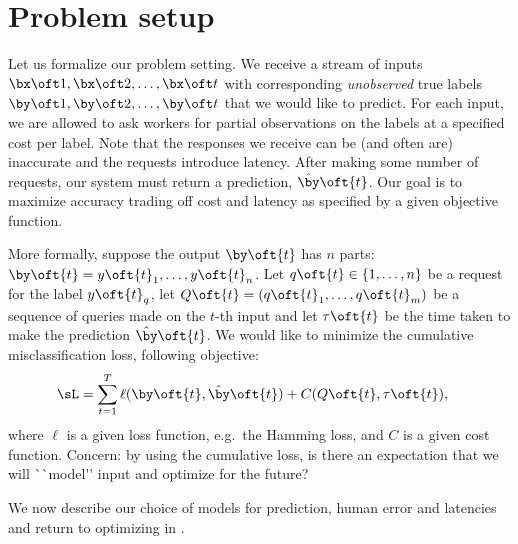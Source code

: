 \section{Problem setup}
\label{sec:model}


Let us formalize our problem setting. %
We receive a stream of inputs $\bx\oft1, \bx\oft2, \ldots, \bx\oft t$ with corresponding {\em unobserved\/} true labels $\by\oft1, \by\oft2, \ldots, \by\oft t$ that we would like to predict.
For each input, we are allowed to ask workers for partial observations on the labels at a specified cost per label.
Note that the responses we receive can be (and often are) inaccurate and the requests introduce latency.
After making some number of requests, our system must return a prediction, $\byt\oft{t}$.
Our goal is to maximize accuracy trading off cost and latency as specified by a given objective function.

More formally, suppose the output $\by\oft{t}$ has $n$ parts: $\by\oft{t} = y\oft{t}_1, \dots, y\oft{t}_n$.
Let $q\oft{t} \in \{1, \ldots, n\}$ be a request for the label $y\oft{t}_q$,
let $Q\oft{t} = (q\oft{t}_1, \dots, q\oft{t}_m)$ be a sequence of queries made on the $t$-th input and
let $\tau\oft{t}$ be the time taken to make the prediction $\byt\oft{t}$. 
We would like to minimize the cumulative misclassification loss, 
following objective:
\begin{align}
  \sL &= \sum_{t=1}^T \ell(\by\oft{t}, \byt\oft{t}) + C(Q\oft{t}, \tau\oft{t}), \label{eqn:objective}
\end{align}
where $\ell$ is a given loss function, e.g.\ the Hamming loss, and $C$ is a given cost function.
\ac{Concern: by using the cumulative loss, is there an expectation that we will ``model'' input and optimize for the future?}

We now describe our choice of models for prediction, human error and latencies and return to optimizing  in .


